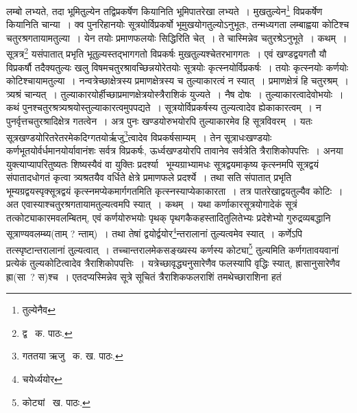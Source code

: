 \documentclass[11pt, openany]{book}
\begin{document}
\noindent लम्बो लभ्यते, तदा भूमितुल्येन तद्विप्रकर्षेण कियानिति भूमिपातरेखा लभ्यते~। मुखतुल्येन\renewcommand{\thefootnote}{१}\footnote{तुल्येनैव} विप्रकर्षेण कियानिति चान्या~। क्व पुनरिहानयोः सूत्रयोर्विप्रकर्षो भूमुखयोगतुल्योऽनुभूतः, तन्मध्यगता लम्बाह्वया कोटिश्च चतुरश्रगतायामतुल्या~। येन तयोः प्रमाणफलयोः सिद्धिरिति चेत्~। ते चास्मिन्नेव चतुरश्रेऽनुभूते~। कथम्~। सूत्रत्र\renewcommand{\thefootnote}{२}\footnote{द्व \textendash\ क. पाठः.} यसंपातात् प्रभृति भूतुल्यस्तद्भागगतो विप्रकर्षः मुखतुल्यश्चेतरभागगतः~। एवं खण्डद्वयगतौ यौ विप्रकर्षौ तदैक्यतुल्यः खलु विषमचतुरश्रावच्छिन्नयोरेतयोः सूत्रयोः कृत्स्नयोर्विप्रकर्षः~। तयोः कृत्स्नयोः कर्णयोः कोटिश्चायामतुल्या~। नन्वत्रेच्छाक्षेत्रस्य प्रमाणक्षेत्रस्य च तुल्याकारत्वं न स्यात्~। प्रमाणक्षेत्रं हि चतुरश्रम्~।
त्र्यश्रं चान्यत्~। तुल्याकारयोर्हीच्छाप्रमाणक्षेत्रयोस्त्रैराशिकं युज्यते~। नैष दोषः~। तुल्याकारत्वादेवोभयोः~। कथं
पुनश्चतुरश्रत्र्यश्रयोस्तुल्याकारत्वमुपपद्यते~। सूत्रयोर्विप्रकर्षस्य तुल्यत्वादेव ह्येकाकारत्वम्~। न पुनर्वृत्तचतुरश्रादिक्षेत्र गतत्वेन~। अत्र पुनः खण्डयोरुभयोरपि तुल्याकारमेव हि सूत्रविवरम्~। यतः सूत्रखण्डयोरितरेतरमेकदिग्गतयोर्ऋजु\renewcommand{\thefootnote}{३}\footnote{गततया ऋजु \textendash\ क. ख. पाठः.}त्वादेव विप्रकर्षसाम्यम्~। तेन सूत्राधःखण्डयोः कर्णभूतयोर्वर्धमानयोर्यावानंशः सर्वत्र विप्रकर्षः, ऊर्ध्वखण्डयोरपि तावानेव सर्वत्रेति त्रैराशिकोपपत्तिः~। अनया युक्त्याप्यापरितुष्यतः शिष्यस्यैवं वा युक्तिः प्रदर्श्या \textendash\ भूम्यग्राभ्यामधः सूत्रद्वयमाकृष्य कृत्स्नमपि सूत्रद्वयं संपातादधोगतं कृत्वा त्र्यश्रतयैव वर्धिते क्षेत्रे
प्रमाणफले प्रदर्श्ये~। तथा सति संपातात् प्रभृति भूम्यग्रद्वयस्पृक्सूत्रद्वयं कृत्स्नमप्येकमार्गगतमिति कृत्स्नस्याप्येकाकारता~। तत्र पातरेखाद्वयतुल्यैव कोटिः~। अत एवास्याश्चतुरश्रगतायामतुल्यत्वमपि स्यात्~। कथम्~। यथा कर्णाकारसूत्रयोगादेकं सूत्रं तत्कोट्याकारमवलम्बितम्, एवं कर्णयोरुभयोः पृथक् पृथगकैकहस्तादितुलितेभ्यः प्रदेशेभ्यो गुरुद्रव्यबद्धानि सूत्राण्यवलम्ब्य(ताम् ?
न्ताम्)~। तथा तेषां द्वयोर्द्वयोर\renewcommand{\thefootnote}{४}\footnote{चयेर्ध्ययोर}न्तरालानां तुल्यत्वमेव स्यात्~। कर्णेऽपि तत्स्पृष्टान्तरालानां तुल्यत्वात्~। तच्चान्तरालमेकसङ्ख्यस्य कर्णस्य कोट्या\renewcommand{\thefootnote}{५}\footnote{कोट्यां \textendash\ ख. पाठः.} तुल्यमिति कर्णगतावयवानां प्रत्येकं तुल्यकोटित्वादेव त्रैराशिकोपपत्तिः~। यत्रेच्छावृद्ध्यनुसारेणैव फलस्यापि वृद्धिः स्यात्, ह्रासानुसारेणैव ह्रा(सा~? स)श्च~। एतदप्यस्मिन्नेव सूत्रे सूचितं {\qt त्रैराशिकफलराशिं तमथेच्छाराशिना हतं}

\newpage
\end{document}
